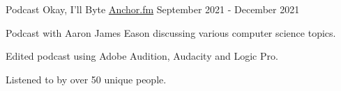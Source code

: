 
\begin{cventries}
  \cventry
    {Podcast}
    {Okay, I'll Byte}
    {\href{https://anchor.fm/acm-podcast}{Anchor.fm}}
    {September 2021 - December 2021}
    {
      \begin{cvitems}
        \item {Podcast with Aaron James Eason discussing various computer science topics.}
        \item {Edited podcast using Adobe Audition, Audacity and Logic Pro.}
        \item {Listened to by over 50 unique people.}
      \end{cvitems}
    }  

\end{cventries}
